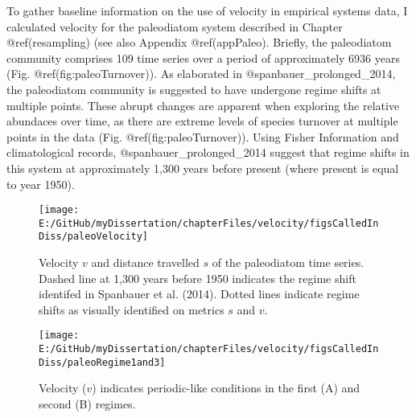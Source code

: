 \documentclass[]{article}
\begin{document}
To gather baseline information on the use of velocity in empirical
systems data, I calculated velocity for the paleodiatom system described
in Chapter @ref(resampling) (see also Appendix @ref(appPaleo). Briefly,
the paleodiatom community comprises 109 time series over a period of
approximately 6936 years (Fig. @ref(fig:paleoTurnover)). As elaborated
in @spanbauer\_prolonged\_2014, the paleodiatom community is suggested
to have undergone regime shifts at multiple points. These abrupt changes
are apparent when exploring the relative abundaces over time, as there
are extreme levels of species turnover at multiple points in the data
(Fig. @ref(fig:paleoTurnover)). Using Fisher Information and
climatological records, @spanbauer\_prolonged\_2014 suggest that regime
shifts in this system at approximately 1,300 years before present (where
present is equal to year 1950).

\begin{figure}

{\centering \texttt{[image: E:/GitHub/myDissertation/chapterFiles/velocity/figsCalledInDiss/paleoVelocity]} 

}

\caption{Velocity $v$ and distance travelled $s$ of the paleodiatom time series. Dashed line at 1,300 years before 1950 indicates the regime shift identifed in Spanbauer et al. (2014). Dotted lines indicate regime shifts as visually identified on metrics $s$ and $v$.}\label{fig:paleoVelocity}
\end{figure}
\begin{figure}

{\centering \texttt{[image: E:/GitHub/myDissertation/chapterFiles/velocity/figsCalledInDiss/paleoRegime1and3]} 

}

\caption{Velocity ($v$) indicates periodic-like conditions in the first (A) and second (B) regimes.}\label{fig:paleoRegime1and3}
\end{figure}
\end{document}
